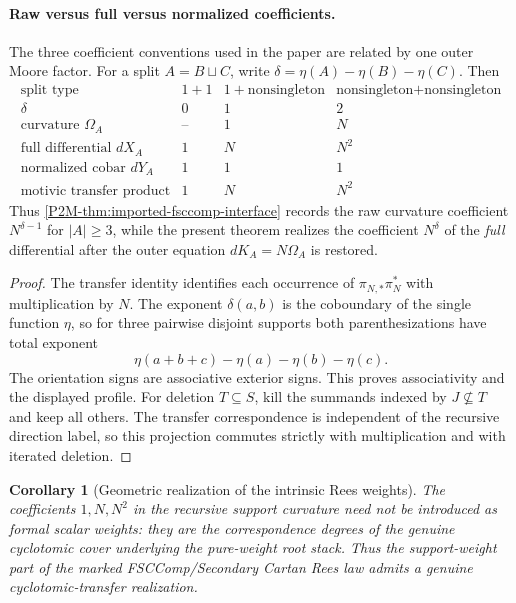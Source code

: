 \documentclass[11pt]{article}
\newtheorem{corollary}[theorem]{Corollary}
\theoremstyle{remark}
\begin{document}
\paragraph{Raw versus full versus normalized coefficients.}
The three coefficient conventions used in the paper are related by one
outer Moore factor.  For a split \(A=B\sqcup C\), write
\(\delta=\eta(A)-\eta(B)-\eta(C)\).  Then
\[
\begin{array}{c|ccc}
\text{split type}
 &1+1&1+\text{nonsingleton}
 &\text{nonsingleton}+\text{nonsingleton}\\ \hline
\delta&0&1&2\\
\text{curvature }\Omega_A
 &\text{--}&1&N\\
\text{full differential }dX_A
 &1&N&N^2\\
\text{normalized cobar }dY_A
 &1&1&1\\
\text{motivic transfer product}
 &1&N&N^2
\end{array}
\]
Thus \cref{P2M-thm:imported-fsccomp-interface} records the raw curvature
coefficient \(N^{\delta-1}\) for \(|A|\ge3\), while the present theorem
realizes the coefficient \(N^\delta\) of the \emph{full} differential after
the outer equation \(dK_A=N\Omega_A\) is restored.


\begin{proof}
The transfer identity identifies each occurrence of
\(\pi_{N,*}\pi_N^*\) with multiplication by \(N\).  The exponent
\(\delta(a,b)\) is the coboundary of the single function \(\eta\), so for
three pairwise disjoint supports both parenthesizations have total exponent
\[
 \eta(a+b+c)-\eta(a)-\eta(b)-\eta(c).
\]
The orientation signs are associative exterior signs.  This proves
associativity and the displayed profile.  For deletion \(T\subseteq S\),
kill the summands indexed by \(J\not\subseteq T\) and keep all others.  The
transfer correspondence is independent of the recursive direction label, so
this projection commutes strictly with multiplication and with iterated
deletion.
\end{proof}

\begin{corollary}[Geometric realization of the intrinsic Rees weights]
\label{P2M-cor:rees-weights-motivic}
The coefficients \(1,N,N^2\) in the recursive support curvature need not be
introduced as formal scalar weights: they are the correspondence degrees of
the genuine cyclotomic cover underlying the pure-weight root stack.  Thus the support-weight part of the marked FSCComp/Secondary Cartan Rees law admits a genuine cyclotomic-transfer realization.
\end{corollary}
\end{document}
